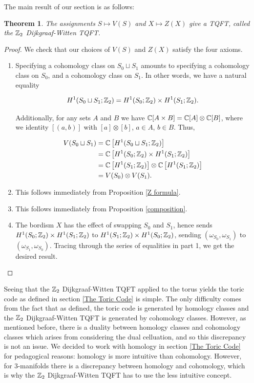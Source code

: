 \documentclass{article}
\newtheorem{theorem}{Theorem}[section]
\theoremstyle{definition}
\numberwithin{figure}{section}
\begin{document}
The main result of our section is as follows:

\begin{theorem} The assignments $S\mapsto V(S)$ and $X\mapsto Z(X)$ give a TQFT, called the $\mathbb{Z}_2$ Dijkgraaf-Witten TQFT.
\end{theorem}
\begin{proof} We check that our choices of $V(S)$ and $Z(X)$ satisfy the four axioms.

\begin{enumerate}
\item Specifying a cohomology class on $S_0\sqcup S_1$ amounts to specifying a cohomology class on $S_0$, and a cohomology class on $S_1$. In other words, we have a natural equality

$$H^1(S_0\sqcup S_1;\mathbb{Z}_2)=H^1(S_0;\mathbb{Z}_2)\times H^1(S_1;\mathbb{Z}_2).$$

Additionally, for any sets $A$ and $B$ we have $\mathbb{C}[A\times B]=\mathbb{C}[A]\otimes \mathbb{C}[B]$, where we identity $[(a,b)]$ with $[a]\otimes [b]$, $a\in A$, $b\in B$. Thus,

\begin{align*}
V(S_0\sqcup S_1)&=\mathbb{C}\left[H^1(S_0\sqcup S_1;\mathbb{Z}_2)\right]\\
&=\mathbb{C}\left[H^1(S_0;\mathbb{Z}_2)\times H^1(S_1;\mathbb{Z}_2)\right]\\
&=\mathbb{C}\left[H^1(S_1;\mathbb{Z}_2)\right]\otimes \mathbb{C}\left[ H^1(S_1;\mathbb{Z}_2)\right]\\
&=V(S_0)\otimes V(S_1).
\end{align*}

\item This follows immediately from Proposition \ref{Z formula}.
\item This follows immediately from Proposition \ref{composition}.
\item The bordism $X$ has the effect of swapping $S_0$ and $S_1$, hence sends $H^1(S_0;\mathbb{Z}_2)\times H^1(S_1;\mathbb{Z}_2)$ to $H^1(S_1;\mathbb{Z}_2)\times H^1(S_0;\mathbb{Z}_2)$, sending $(\omega_{S_0},\omega_{S_1})$ to $(\omega_{S_1},\omega_{S_0})$. Tracing through the series of equalities in part 1, we get the desired result.
\end{enumerate}
\end{proof}

Seeing that the $\mathbb{Z}_2$ Dijkgraaf-Witten TQFT applied to the torus yields the toric code as defined in section \ref{The Toric Code} is simple. The only difficulty comes from the fact that as defined, the toric code is generated by homology classes and the $\mathbb{Z}_2$ Dijkgraaf-Witten TQFT is generated by cohomology classes. However, as mentioned before, there is a duality between homology classes and cohomology classes which arises from considering the dual celluation, and so this discrepancy is not an issue. We decided to work with homology in section \ref{The Toric Code} for pedagogical reasons: homology is more intuitive than cohomology. However, for 3-manifolds there is a discrepancy between homology and cohomology, which is why the $\mathbb{Z}_2$ Dijkgraaf-Witten TQFT has to use the less intuitive concept.
\end{document}
